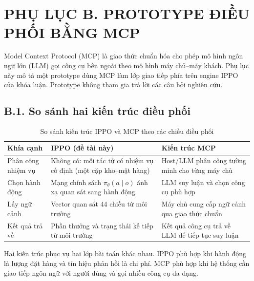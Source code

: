 
\chapter*{PHỤ LỤC B. PROTOTYPE ĐIỀU PHỐI BẰNG MCP}
\label{app:mcp}

Model Context Protocol (MCP) là giao thức chuẩn hóa cho phép mô hình ngôn ngữ
lớn (LLM) gọi công cụ bên ngoài theo mô hình máy chủ--máy khách. Phụ lục này mô
tả một prototype dùng MCP làm lớp giao tiếp phía trên engine IPPO của khóa luận.
Prototype không tham gia trả lời các câu hỏi nghiên cứu.

\section*{B.1. So sánh hai kiến trúc điều phối}

\begin{table}[htbp]
    \centering
    \caption{So sánh kiến trúc IPPO và MCP theo các chiều điều phối}
    \label{tab:soSanhMCP}
    \small
    \begin{tabular}{lp{5.0cm}p{5.0cm}}
        \toprule
        \textbf{Khía cạnh} & \textbf{IPPO (đề tài này)} & \textbf{Kiến trúc MCP} \\
        \midrule
        Phân công nhiệm vụ & Không có: mỗi tác tử có nhiệm vụ cố định (một cặp kho--mặt hàng) & Host/LLM phân công tường minh cho từng máy chủ \\
        Chọn hành động & Mạng chính sách $\pi_\theta(a \mid o)$ ánh xạ quan sát sang hành động & LLM suy luận và chọn công cụ phù hợp \\
        Lấy ngữ cảnh & Vector quan sát $44$ chiều từ môi trường & Máy chủ cung cấp ngữ cảnh qua giao thức chuẩn \\
        Kết quả trả về & Phần thưởng và trạng thái kế tiếp từ môi trường & Kết quả công cụ trả về LLM để tiếp tục suy luận \\
        \bottomrule
    \end{tabular}
\end{table}

Hai kiến trúc phục vụ hai lớp bài toán khác nhau. IPPO phù hợp khi hành động là
lượng đặt hàng và tín hiệu phản hồi là chi phí. MCP phù hợp khi hệ thống cần
giao tiếp ngôn ngữ với người dùng và gọi nhiều công cụ đa dạng.

